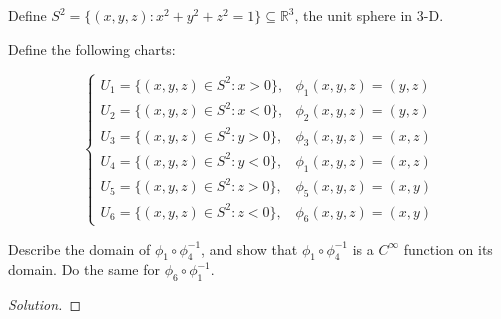 \documentclass[10pt]{article}
\newenvironment{problem}[2][]{\begin{trivlist}
\item[\hskip \labelsep {\bfseries #1}\hskip \labelsep {\bfseries #2.}]}{\end{trivlist}}
\begin{document}
\begin{problem}{Question 6}

Define $S^2 = \{ (x,y,z) : x^2 + y^2 + z^2 = 1 \} \subseteq \mathbb{R}^3$, the unit sphere in 3-D.

Define the following charts:

$$\begin{cases} U_1 = \{ (x,y,z) \in S^2 : x > 0 \}, & \phi_1(x,y,z) = (y,z) \\  U_2 = \{ (x,y,z) \in S^2 : x < 0 \}, & \phi_2(x,y,z) = (y,z) \\  U_3 = \{ (x,y,z) \in S^2 : y > 0 \}, & \phi_3(x,y,z) = (x,z) \\  U_4 = \{ (x,y,z) \in S^2 : y <  0 \}, & \phi_1(x,y,z) = (x,z) \\  U_5 = \{ (x,y,z) \in S^2 : z > 0 \}, & \phi_5(x,y,z) = (x,y) \\  U_6 = \{ (x,y,z) \in S^2 : z < 0 \}, & \phi_6(x,y,z) = (x,y) \end{cases}$$

Describe the domain of $\phi_1 \circ \phi_4^{-1}$, and show that $\phi_1 \circ \phi_4^{-1}$ is a $C^\infty$ function on its domain. Do the same for $\phi_6 \circ \phi_1^{-1}$.

\end{problem}

\begin{proof}[Solution]


\end{proof}
\end{document}
